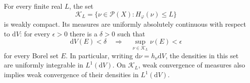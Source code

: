 \begin{theorem}\label{thm:normalization-dual-compactness}
For every finite real $L$, the set
\[
 \mathcal K_L=\{\nu\in\mathcal P(X):H_\varphi(\nu)\leq L\}
\]
is weakly compact. Its measures are uniformly absolutely continuous with respect to $\mathrm{d}V$: for every $\epsilon>0$ there is a $\delta>0$ such that
\begin{equation}\label{eq:normalization-dual-uniform-ac}
 \mathrm{d}V(E)<\delta\quad\Longrightarrow\quad
 \sup_{\nu\in\mathcal K_L}\nu(E)<\epsilon
\end{equation}
for every Borel set $E$. In particular, writing $\mathrm{d}\nu=h_\nu \mathrm{d}V$, the densities in this set are uniformly integrable in $L^1(\mathrm{d}V)$. On $\mathcal K_L$, weak convergence of measures also implies weak convergence of their densities in $L^1(\mathrm{d}V)$.
\end{theorem}
